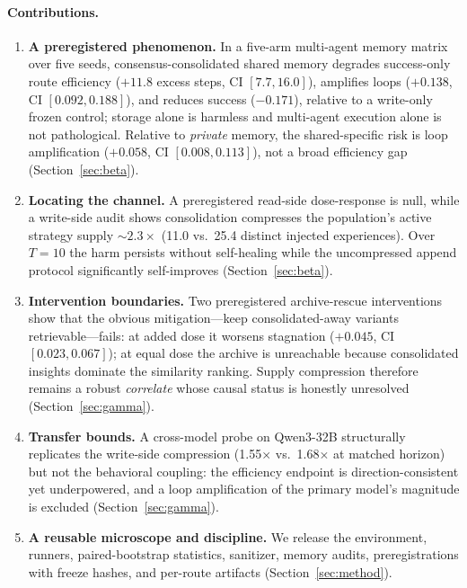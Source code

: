 \documentclass[11pt]{article}
\begin{document}
\paragraph{Contributions.}
\begin{enumerate}[leftmargin=1.6em]
\item \textbf{A preregistered phenomenon.} In a five-arm multi-agent memory matrix over five
seeds, consensus-consolidated shared memory degrades success-only route efficiency
($+11.8$ excess steps, CI $[7.7,16.0]$), amplifies loops ($+0.138$, CI $[0.092,0.188]$), and
reduces success ($-0.171$), relative to a write-only frozen control; storage alone is harmless
and multi-agent execution alone is not pathological. Relative to \emph{private} memory, the
shared-specific risk is loop amplification ($+0.058$, CI $[0.008,0.113]$), not a broad
efficiency gap (Section~\ref{sec:beta}).
\item \textbf{Locating the channel.} A preregistered read-side dose-response is null, while a
write-side audit shows consolidation compresses the population's active strategy supply
${\sim}2.3\times$ (11.0 vs.\ 25.4 distinct injected experiences). Over $T{=}10$ the harm
persists without self-healing while the uncompressed append protocol significantly
self-improves (Section~\ref{sec:beta}).
\item \textbf{Intervention boundaries.} Two preregistered archive-rescue interventions show
that the obvious mitigation---keep consolidated-away variants retrievable---fails: at added
dose it worsens stagnation ($+0.045$, CI $[0.023,0.067]$); at equal dose the archive is
unreachable because consolidated insights dominate the similarity ranking. Supply compression
therefore remains a robust \emph{correlate} whose causal status is honestly unresolved
(Section~\ref{sec:gamma}).
\item \textbf{Transfer bounds.} A cross-model probe on Qwen3-32B structurally replicates the
write-side compression (1.55$\times$ vs.\ 1.68$\times$ at matched horizon) but not the
behavioral coupling: the efficiency endpoint is direction-consistent yet underpowered, and a
loop amplification of the primary model's magnitude is excluded (Section~\ref{sec:gamma}).
\item \textbf{A reusable microscope and discipline.} We release the environment, runners,
paired-bootstrap statistics, sanitizer, memory audits, preregistrations with freeze hashes, and
per-route artifacts (Section~\ref{sec:method}).
\end{enumerate}
\end{document}
